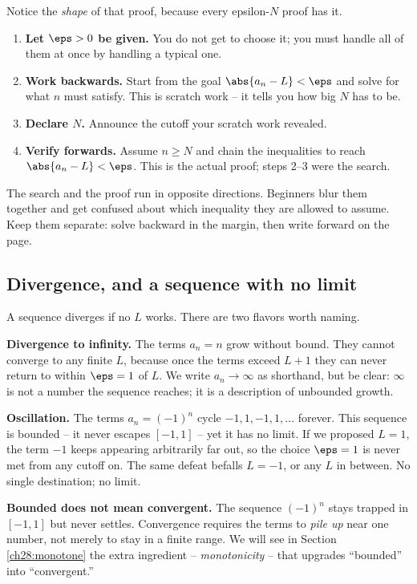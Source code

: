 \begin{whybox}
Notice the \emph{shape} of that proof, because every epsilon-$N$ proof has it.
\begin{enumerate}
  \item \textbf{Let $\eps > 0$ be given.} You do not get to choose it; you must
        handle all of them at once by handling a typical one.
  \item \textbf{Work backwards.} Start from the goal $\abs{a_n - L} < \eps$ and
        solve for what $n$ must satisfy. This is scratch work -- it tells you how
        big $N$ has to be.
  \item \textbf{Declare $N$.} Announce the cutoff your scratch work revealed.
  \item \textbf{Verify forwards.} Assume $n \ge N$ and chain the inequalities to
        reach $\abs{a_n - L} < \eps$. This is the actual proof; steps 2--3 were
        the search.
\end{enumerate}
The search and the proof run in opposite directions. Beginners blur them
together and get confused about which inequality they are allowed to assume.
Keep them separate: solve backward in the margin, then write forward on the page.
\end{whybox}

\subsection*{Divergence, and a sequence with no limit}

A sequence diverges if no $L$ works. There are two flavors worth naming.

\textbf{Divergence to infinity.} The terms $a_n = n$ grow without bound. They
cannot converge to any finite $L$, because once the terms exceed $L + 1$ they can
never return to within $\eps = 1$ of $L$. We write $a_n \to \infty$ as shorthand,
but be clear: $\infty$ is not a number the sequence reaches; it is a description
of unbounded growth.

\textbf{Oscillation.} The terms $a_n = (-1)^n$ cycle $-1, 1, -1, 1, \dots$
forever. This sequence is bounded -- it never escapes $[-1, 1]$ -- yet it has no
limit. If we proposed $L = 1$, the term $-1$ keeps appearing arbitrarily far out,
so the choice $\eps = 1$ is never met from any cutoff on. The same defeat befalls
$L = -1$, or any $L$ in between. No single destination; no limit.

\begin{trapbox}
\textbf{Bounded does not mean convergent.} The sequence $(-1)^n$ stays trapped in
$[-1,1]$ but never settles. Convergence requires the terms to \emph{pile up} near
one number, not merely to stay in a finite range. We will see in Section
\ref{ch28:monotone} the extra ingredient -- \emph{monotonicity} -- that upgrades
``bounded'' into ``convergent.''
\end{trapbox}

